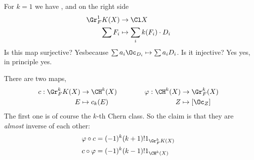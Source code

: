For $k=1$ we have , and on the right side 
\begin{align*}
	\Gr^1_FK(X)&\to\Cl X\\
	\sum F_i&\mapsto\sum_ik(F_i)\cdot D_i
\end{align*}
Is this map surjective? Yesbecause $\sum a_i\Oc_{D_i}\mapsto\sum a_iD_i$. Is it injective? Yes yes, in principle yes.
\begin{claim}
	There are two maps,
	\begin{align*}
		\begin{aligned}
			c:\Gr^k_FK(X)&\to\CH^k(X)\\
			E&\mapsto c_k(E)
		\end{aligned}\qquad\qquad
		\begin{aligned}
			\varphi:\CH^k(X)&\to\Gr_F^k(X)\\
			Z&\mapsto[\Oc_Z]
		\end{aligned}
	\end{align*}
	The first one is of course the $k$-th Chern class. So the claim is that they are \textit{almost} inverse of each other:
	\begin{align*}
		\varphi\circ c&=(-1)^k(k+1)!1_{\Gr^k_FK(X)}\\
		c\circ\varphi&=(-1)^k(k-1)!1_{\CH^k(X)}
	\end{align*}
\end{claim}

